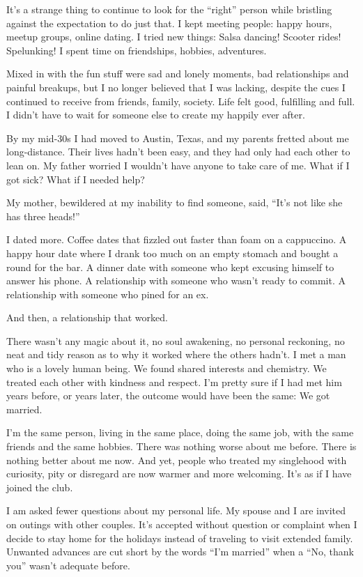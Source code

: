 It's a strange thing to continue to look for the ``right'' person while
bristling against the expectation to do just that. I kept meeting
people: happy hours, meetup groups, online dating. I tried new things:
Salsa dancing! Scooter rides! Spelunking! I spent time on friendships,
hobbies, adventures.

Mixed in with the fun stuff were sad and lonely moments, bad
relationships and painful breakups, but I no longer believed that I was
lacking, despite the cues I continued to receive from friends, family,
society. Life felt good, fulfilling and full. I didn't have to wait for
someone else to create my happily ever after.

By my mid-30s I had moved to Austin, Texas, and my parents fretted about
me long-distance. Their lives hadn't been easy, and they had only had
each other to lean on. My father worried I wouldn't have anyone to take
care of me. What if I got sick? What if I needed help?

My mother, bewildered at my inability to find someone, said, ``It's not
like she has three heads!''

I dated more. Coffee dates that fizzled out faster than foam on a
cappuccino. A happy hour date where I drank too much on an empty stomach
and bought a round for the bar. A dinner date with someone who kept
excusing himself to answer his phone. A relationship with someone who
wasn't ready to commit. A relationship with someone who pined for an ex.

And then, a relationship that worked.

There wasn't any magic about it, no soul awakening, no personal
reckoning, no neat and tidy reason as to why it worked where the others
hadn't. I met a man who is a lovely human being. We found shared
interests and chemistry. We treated each other with kindness and
respect. I'm pretty sure if I had met him years before, or years later,
the outcome would have been the same: We got married.

I'm the same person, living in the same place, doing the same job, with
the same friends and the same hobbies. There was nothing worse about me
before. There is nothing better about me now. And yet, people who
treated my singlehood with curiosity, pity or disregard are now warmer
and more welcoming. It's as if I have joined the club.

I am asked fewer questions about my personal life. My spouse and I are
invited on outings with other couples. It's accepted without question or
complaint when I decide to stay home for the holidays instead of
traveling to visit extended family. Unwanted advances are cut short by
the words ``I'm married'' when a ``No, thank you'' wasn't adequate
before.


